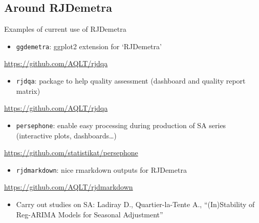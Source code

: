 \documentclass[10pt,xcolor=table,color={dvipsnames,usenames},ignorenonframetext,usepdftitle=false,french]{beamer}
\providecommand{\tightlist}{%
  \setlength{\parskip}{0pt}
  }
\begin{document}
\hypertarget{around-rjdemetra}{%
\subsection{Around RJDemetra}\label{around-rjdemetra}}

\begin{frame}[fragile]{Examples of current use of RJDemetra}
\protect\hypertarget{examples-of-current-use-of-rjdemetra}{}

\begin{itemize}
\tightlist
\item
  \texttt{ggdemetra}: ggplot2 extension for `RJDemetra'
\end{itemize}

\faGithub{} \url{https://github.com/AQLT/rjdqa}

\begin{itemize}
\tightlist
\item
  \texttt{rjdqa}: package to help quality assessment (dashboard and
  quality report matrix)
\end{itemize}

\faGithub{} \url{https://github.com/AQLT/rjdqa}

\begin{itemize}
\tightlist
\item
  \texttt{persephone}: enable easy processing during production of SA
  series (interactive plots, dashboards\ldots{})
\end{itemize}

\faGithub{} \url{https://github.com/statistikat/persephone}

\begin{itemize}
\tightlist
\item
  \texttt{rjdmarkdown}: nice rmarkdown outputs for RJDemetra
\end{itemize}

\faGithub{} \url{https://github.com/AQLT/rjdmarkdown}

\begin{itemize}
\tightlist
\item
  Carry out studies on SA: Ladiray D., Quartier-la-Tente A.,
  ``(In)Stability of Reg-ARIMA Models for Seasonal Adjustment''
\end{itemize}

\end{frame}
\end{document}

